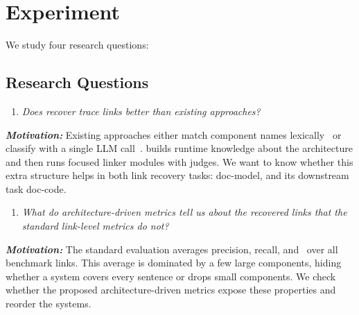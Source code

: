 \section{Experiment}

We study four research questions:
\subsection{Research Questions}


\begin{enumerate}[leftmargin=*, labelindent=0em, label=\textbf{RQ\arabic*}:,
ref=RQ\arabic*, series=researchQuestions] \item \label{rq:sota}
\emph{Does \approach recover trace links better than existing approaches?} 
\end{enumerate}
\emph{\textbf{Motivation:}}
Existing approaches either match component names lexically~\cite{keim_trace_2021} or classify with a single \ac{LLM} call~\cite{fuchs_whos_2025}. 
\approach builds runtime knowledge about the architecture and then runs focused linker modules with \evidenceBacked judges.
We want to know whether this extra structure helps in both link recovery tasks: doc-model, and its downstream task doc-code.

\begin{enumerate}[leftmargin=*, labelindent=0em, label=\textbf{RQ\arabic*}:, ref=RQ\arabic*, series=researchQuestions, resume]
    \item \label{rq:metrics} \emph{What do architecture-driven metrics tell us about the recovered links that the standard link-level metrics do not?}
\end{enumerate}
\emph{\textbf{Motivation:}}
The standard evaluation averages precision, recall, and \fone\ over all benchmark links.
This average is dominated by a few large components, hiding whether a system covers every sentence or drops small components.
We check whether the proposed architecture-driven metrics expose these properties and reorder the systems.

